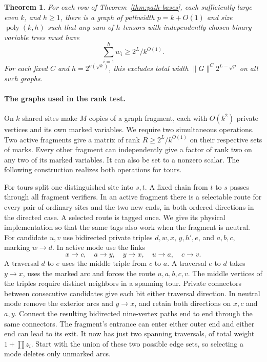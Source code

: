 \documentclass[11pt]{article}
\newtheorem{theorem}{Theorem}[section]
\theoremstyle{definition}
\begin{document}
\begin{theorem}\label{thm:orders}
For each row of Theorem~\ref{thm:path-bases}, each sufficiently large even \(k\), and \(h\ge1\), there is a graph of pathwidth \(p=k+O(1)\) and size \(\operatorname{poly}(k,h)\) such that any sum of \(h\) tensors with independently chosen binary variable trees must have
\[
                       \sum_{i=1}^h w_i\ge 2^L/k^{O(1)} .
\]
For each fixed \(C\) and \(h=2^{o(\sqrt k)}\), this excludes total width \(\|G\|^C2^{L-\sqrt p}\) on all such graphs.
\end{theorem}

\paragraph{The graphs used in the rank test.}
On \(k\) shared sites make \(M\) copies of a graph fragment, each with \(O(k^2)\) private vertices and its own marked variables. We require two simultaneous operations. Two active fragments give a matrix of rank \(R\ge 2^L/k^{O(1)}\) on their respective sets of marks. Every other fragment can independently give a factor of rank two on any two of its marked variables. It can also be set to a nonzero scalar. The following construction realizes both operations for tours.

For tours split one distinguished site into \(s,t\). A fixed chain from \(t\) to \(s\) passes through all fragment verifiers. In an active fragment there is a selectable route for every pair of ordinary sites and the two new ends, in both ordered directions in the directed case. A selected route is tagged once. We give its physical implementation so that the same tags also work when the fragment is neutral. For candidate \(u,v\) use bidirected private triples \(d,w,x\), \(y,h',e\), and \(a,b,c\), marking \(w\to d\). In active mode use the links
\[
             x\to c,\quad a\to y,\quad y\to x,\quad u\to a,\quad c\to v .
\]
A traversal \(d\) to \(e\) uses the middle triple from \(c\) to \(a\). A traversal \(e\) to \(d\) takes \(y\to x\), uses the marked arc and forces the route \(u,a,b,c,v\). The middle vertices of the triples require distinct neighbors in a spanning tour. Private connectors between consecutive candidates give each bit either traversal direction. In neutral mode remove the exterior arcs and \(y\to x\), and retain both directions on \(x,c\) and \(a,y\). Connect the resulting bidirected nine-vertex paths end to end through the same connectors. The fragment's entrance can enter either outer end and either end can lead to its exit. It now has just two spanning traversals, of total weight \(1+\prod z_i\). Start with the union of these two possible edge sets, so selecting a mode deletes only unmarked arcs.
\end{document}
